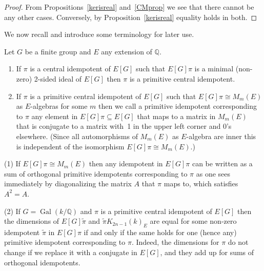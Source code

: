 \documentclass{amsart}
\begin{document}
\begin{proof}
From Propositions~\ref{kerisreal} and~\ref{CMprop} we see that there cannot
be any other cases.  Conversely, by Proposition~\ref{kerisreal} equality holds in both.
\end{proof}

We now recall and introduce some terminology for later use.

\begin{definition}\label{mindef}
Let $ G $ be a finite group and $ E $ any extension of $ {\mathbb Q} $.
\begin{enumerate}
\item
If $ \pi $ is a central idempotent of $ E[G] $ such that $ E[G] \pi $ is a minimal (non-zero) 2-sided ideal of $ E[G] $
then $ \pi $ is a primitive central idempotent.

\item
If $ \pi $ is a primitive central idempotent of $ E[G] $
such that $ E[G] \pi {\cong} M_m(E) $ as $ E $-algebras for some $ m $ then we call a primitive idempotent corresponding
to $ \pi $ any element in $ E[G] \pi \subseteq E[G] $ that maps to a matrix in $ M_m(E) $ that is conjugate
to a matrix with~1 in the upper left corner and 0's elsewhere.  (Since all automorphisms of $ M_m(E) $
as $ E $-algebra are inner this is independent of the isomorphism $ E[G] \pi {\cong} M_m(E) $.)
\end{enumerate}
\end{definition}

\begin{remark}{\label{minrem}}
(1)
If $ E[G] \pi {\cong} M_m(E) $ then any idempotent in $ E[G] \pi $ can be written as a sum of 
orthogonal primitive idempotents corresponding to $ \pi $ as one sees immediately by diagonalizing the
matrix $ A $ that $ \pi $ maps to, which satisfies $ A^2=A $.

(2)
If $ G = {\operatorname{Gal}}(k/{\mathbb Q}) $  and $ \pi $ is a primitive central idempotent of $ E[G] $
then the dimensions of $ E[G] \tilde \pi $ and $ \tilde \pi {K_{2n-1}(k)_E}$ are equal for some non-zero idempotent
$ \tilde \pi $ in $ E[G] \pi $ if and only
if the same holds for one (hence any) primitive idempotent corresponding to $ \pi $.
Indeed, the dimensions for $ \pi $ do not change if we replace it with a conjugate in $ E[G] $, and they
add up for sums of orthogonal idempotents.
\end{remark}
\end{document}
